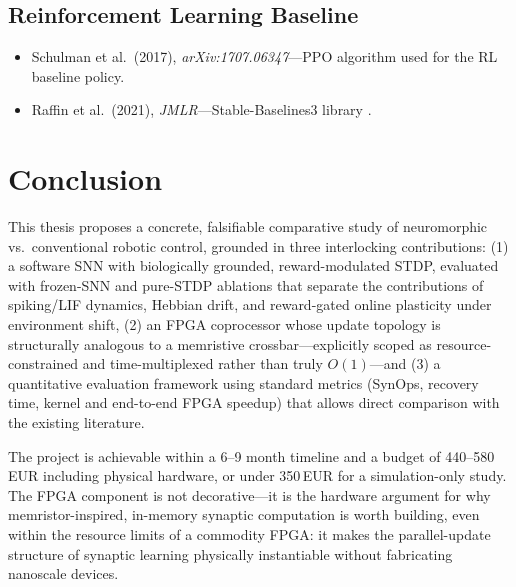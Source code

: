 \documentclass[11pt,a4paper]{article}
\begin{document}
\subsection*{Reinforcement Learning Baseline}
\begin{itemize}[leftmargin=*, itemsep=2pt]
  \item Schulman et al.\ (2017), \textit{arXiv:1707.06347}---PPO algorithm used for
        the RL baseline policy.
  \item Raffin et al.\ (2021), \textit{JMLR}---Stable-Baselines3 library
        \cite{raffin2021}.
\end{itemize}

\section{Conclusion}

This thesis proposes a concrete, falsifiable comparative study of neuromorphic vs.\
conventional robotic control, grounded in three interlocking contributions: (1) a
software SNN with biologically grounded, reward-modulated STDP, evaluated with
frozen-SNN and pure-STDP ablations that separate the contributions of spiking/LIF
dynamics, Hebbian drift, and reward-gated online plasticity under environment shift,
(2) an FPGA coprocessor whose update topology is structurally analogous to a memristive
crossbar---explicitly scoped as resource-constrained and time-multiplexed rather than
truly $O(1)$---and (3) a quantitative evaluation framework using standard metrics
(SynOps, recovery time, kernel and end-to-end FPGA speedup) that allows direct
comparison with the existing literature.

The project is achievable within a 6--9 month timeline and a budget of 440--580\,EUR
including physical hardware, or under 350\,EUR for a simulation-only study. The FPGA
component is not decorative---it is the hardware argument for why memristor-inspired,
in-memory synaptic computation is worth building, even within the resource limits of a
commodity FPGA: it makes the parallel-update structure of synaptic learning
physically instantiable without fabricating nanoscale devices.
\end{document}
